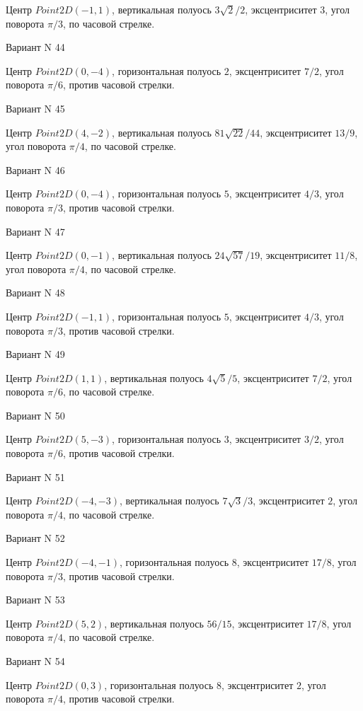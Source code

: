 \documentclass[11pt]{report}
\begin{document}
Центр $Point2D\left(-1, 1\right)$, вертикальная полуось $3 \sqrt{2} / 2$, эксцентриситет $3$, угол поворота $\pi / 3$, по часовой стрелке.

Вариант N 44

Центр $Point2D\left(0, -4\right)$, горизонтальная полуось $2$, эксцентриситет $7 / 2$, угол поворота $\pi / 6$, против часовой стрелки.

Вариант N 45

Центр $Point2D\left(4, -2\right)$, вертикальная полуось $81 \sqrt{22} / 44$, эксцентриситет $13 / 9$, угол поворота $\pi / 4$, по часовой стрелке.

Вариант N 46

Центр $Point2D\left(0, -4\right)$, горизонтальная полуось $5$, эксцентриситет $4 / 3$, угол поворота $\pi / 3$, против часовой стрелки.

Вариант N 47

Центр $Point2D\left(0, -1\right)$, вертикальная полуось $24 \sqrt{57} / 19$, эксцентриситет $11 / 8$, угол поворота $\pi / 4$, по часовой стрелке.

Вариант N 48

Центр $Point2D\left(-1, 1\right)$, горизонтальная полуось $5$, эксцентриситет $4 / 3$, угол поворота $\pi / 3$, против часовой стрелки.

Вариант N 49

Центр $Point2D\left(1, 1\right)$, вертикальная полуось $4 \sqrt{5} / 5$, эксцентриситет $7 / 2$, угол поворота $\pi / 6$, по часовой стрелке.

Вариант N 50

Центр $Point2D\left(5, -3\right)$, горизонтальная полуось $3$, эксцентриситет $3 / 2$, угол поворота $\pi / 6$, против часовой стрелки.

Вариант N 51

Центр $Point2D\left(-4, -3\right)$, вертикальная полуось $7 \sqrt{3} / 3$, эксцентриситет $2$, угол поворота $\pi / 4$, по часовой стрелке.

Вариант N 52

Центр $Point2D\left(-4, -1\right)$, горизонтальная полуось $8$, эксцентриситет $17 / 8$, угол поворота $\pi / 3$, против часовой стрелки.

Вариант N 53

Центр $Point2D\left(5, 2\right)$, вертикальная полуось $56 / 15$, эксцентриситет $17 / 8$, угол поворота $\pi / 4$, по часовой стрелке.

Вариант N 54

Центр $Point2D\left(0, 3\right)$, горизонтальная полуось $8$, эксцентриситет $2$, угол поворота $\pi / 4$, против часовой стрелки.
\end{document}
